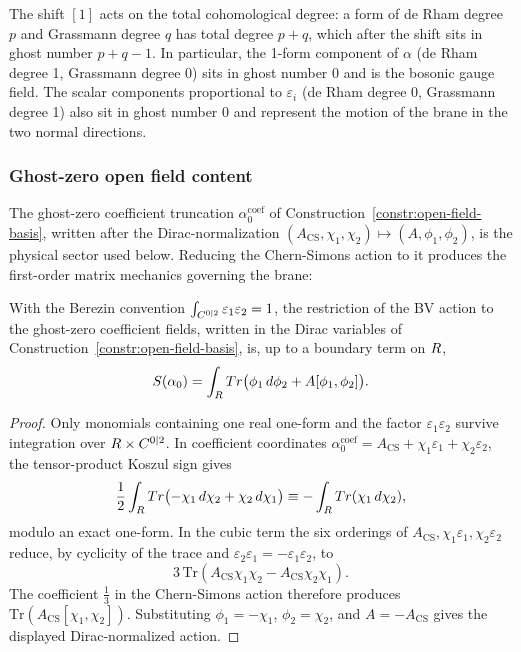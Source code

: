 \documentclass[11pt]{memoir}
\begin{document}
\begin{rmk}
  The shift $[1]$ acts on the total cohomological degree: a form of de Rham
  degree $p$ and Grassmann degree $q$ has total degree $p+q$, which after the
  shift sits in ghost number $p+q-1$. In particular, the 1-form component of
  $\alpha$ (de Rham degree 1, Grassmann degree 0) sits in ghost number 0 and
  is the bosonic gauge field. The scalar components proportional to
  $\varepsilon_i$ (de Rham degree 0, Grassmann degree 1) also sit in ghost
  number 0 and represent the motion of the brane in the two normal directions.
\end{rmk}

\subsubsection{Ghost-zero open field content}

The ghost-zero coefficient truncation
\(\alpha_0^{\mathrm{coef}}\) of
Construction~\ref{constr:open-field-basis}, written after the
Dirac-normalization
\((A_{\mathrm{CS}},\chi_1,\chi_2)\mapsto(A,\phi_1,\phi_2)\), is the
physical sector used below. Reducing the Chern-Simons action to it
produces the first-order matrix mechanics governing the brane:

\begin{lem}\label{lem:open-action-reduction}
  With the Berezin convention
  $\int_{C^{0|2}}\varepsilon_1\varepsilon_2=1$, the restriction of the
  BV action to the ghost-zero coefficient fields, written in the
  Dirac variables of Construction~\ref{constr:open-field-basis}, is, up
  to a boundary term on $R$,
  $$S(\alpha_0)=\int_{R}Tr\bigl(\phi_1\,d\phi_2
    +A[\phi_1,\phi_2]\bigr).$$
\end{lem}

\begin{proof}
  Only monomials containing one real one-form and the factor
  $\varepsilon_1\varepsilon_2$ survive integration over
  $R\times C^{0|2}$.  In coefficient coordinates
  \(\alpha_0^{\mathrm{coef}}
    =A_{\mathrm{CS}}+\chi_1\varepsilon_1+\chi_2\varepsilon_2\), the
  tensor-product Koszul sign gives
  $$\frac12\int_{R}Tr\bigl(-\chi_1\,d\chi_2
      +\chi_2\,d\chi_1\bigr)
    \equiv -\int_{R}Tr(\chi_1\,d\chi_2),$$
  modulo an exact one-form.  In the cubic term the six orderings of
  $A_{\mathrm{CS}},\chi_1\varepsilon_1,\chi_2\varepsilon_2$ reduce, by
  cyclicity of the trace and
  $\varepsilon_2\varepsilon_1=-\varepsilon_1\varepsilon_2$, to
  $$3\,\mathrm{Tr}(A_{\mathrm{CS}}\chi_1\chi_2
      -A_{\mathrm{CS}}\chi_2\chi_1).$$
  The coefficient $\tfrac13$ in the Chern-Simons action therefore produces
  $\mathrm{Tr}(A_{\mathrm{CS}}[\chi_1,\chi_2])$.  Substituting
  \(\phi_1=-\chi_1\), \(\phi_2=\chi_2\), and
  \(A=-A_{\mathrm{CS}}\) gives the displayed Dirac-normalized action.
\end{proof}
\end{document}

